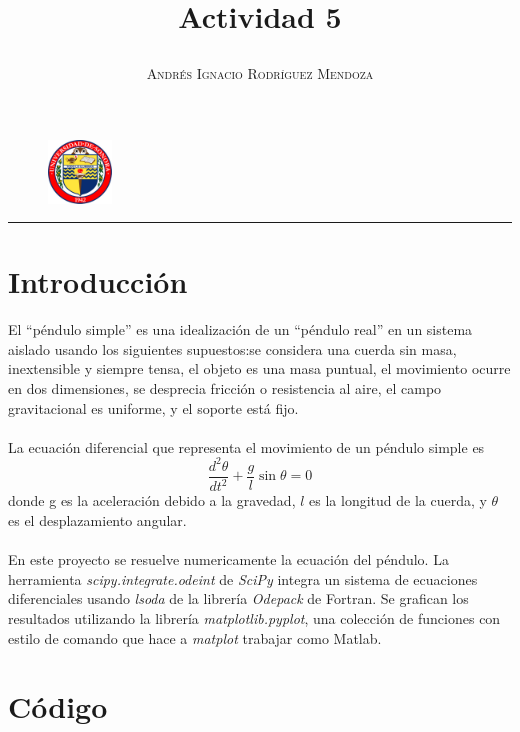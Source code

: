 \documentclass[11pt,spanish]{article}
\title{\vspace{-3cm}\begin{flushleft}\textbf{Actividad 5}\end{flushleft}}
\author{\hspace{-9.6cm}\textsc{Andrés Ignacio Rodríguez Mendoza}}
\date{}
\begin{document}
\begin{figure}
  \begin{center}
   \vspace{-5.4cm} \includegraphics[width=0.15\textwidth]{uni}
  \end{center}
\end{figure}

\maketitle  
\begin{center}
\rule{\textwidth}{1pt}
\end{center}

\section*{Introducción}
El ``péndulo simple'' es una idealización de un ``péndulo real'' en un sistema aislado usando los siguientes supuestos:se considera una cuerda sin masa, inextensible y siempre tensa, el objeto es una masa puntual, el movimiento ocurre en dos dimensiones, se desprecia fricción o resistencia al aire, el campo gravitacional es uniforme, y el soporte está fijo.\\ \\
La ecuación diferencial que representa el movimiento de un péndulo simple es
\begin{equation}
\frac{d^2\theta}{dt^2} + \frac{g}{l} \sin \theta = 0
\end{equation}
donde g es la aceleración debido a la gravedad, $l$ es la longitud de la cuerda, y $\theta$ es el desplazamiento angular.\\ \\
En este proyecto se resuelve numericamente la ecuación del péndulo. La herramienta \textit{scipy.integrate.odeint} de \textit{SciPy} integra un sistema de ecuaciones diferenciales usando \textit{lsoda} de la librería \textit{Odepack} de Fortran. Se grafican los resultados utilizando la librería \textit{matplotlib.pyplot}, una colección de funciones con estilo de comando que hace a \textit{matplot} trabajar como Matlab.
\section*{Código}
\end{document}
